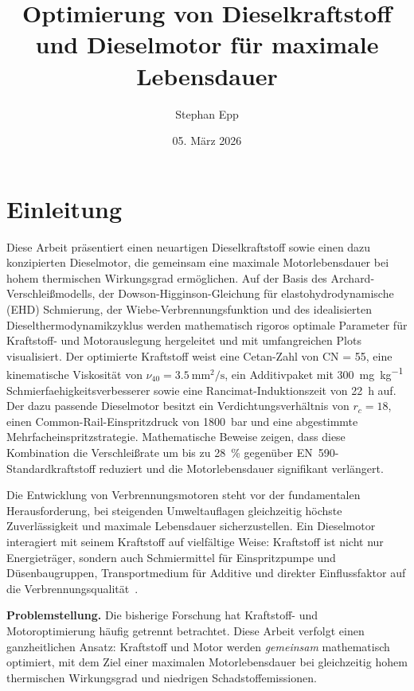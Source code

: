 ﻿\documentclass[12pt,a4paper]{article}
\title{\textbf{Optimierung von Dieselkraftstoff und Dieselmotor für maximale Lebensdauer}}
\author{Stephan Epp}
\date{05. März 2026}
\newcommand{\CN}{\ensuremath{\mathrm{CN}}}
\newcommand{\rc}{\ensuremath{r_c}}
\begin{document}
\maketitle

\tableofcontents
\newpage


\section{Einleitung}
\label{sec:einleitung}
Diese Arbeit präsentiert einen neuartigen Dieselkraftstoff sowie einen
dazu konzipierten Dieselmotor, die gemeinsam eine maximale Motorlebensdauer
bei hohem thermischen Wirkungsgrad ermöglichen. Auf der Basis des
Archard-Verschlei\ss{}modells, der Dowson-Higginson-Gleichung für
elastohydrodynamische (EHD) Schmierung, der Wiebe-Verbrennungsfunktion
und des idealisierten Dieselthermodynamikzyklus werden mathematisch
rigoros optimale Parameter für Kraftstoff- und Motorauslegung hergeleitet
und mit umfangreichen Plots visualisiert. Der optimierte Kraftstoff weist
eine Cetan-Zahl von \CN{} = 55, eine kinematische Viskosität von
$\nu_{40} = \SI{3.5}{\mm\squared\per\s}$, ein Additivpaket mit
\SI{300}{\mg\per\kg} Schmierfaehigkeitsverbesserer sowie eine
Rancimat-Induktionszeit von \SI{22}{\hour} auf. Der dazu passende
Dieselmotor besitzt ein Verdichtungsverhältnis von $\rc = 18$, einen
Common-Rail-Einspritzdruck von \SI{1800}{\bar} und eine abgestimmte
Mehrfacheinspritzstrategie. Mathematische Beweise zeigen, dass diese
Kombination die Verschlei\ss{}rate um bis zu \SI{28}{\percent} gegenüber
EN~590-Standardkraftstoff reduziert und die Motorlebensdauer signifikant
verlängert.

Die Entwicklung von Verbrennungsmotoren steht vor der fundamentalen
Herausforderung, bei steigenden Umweltauflagen gleichzeitig höchste
Zuverlässigkeit und maximale Lebens\-dauer sicherzustellen. Ein Dieselmotor
interagiert mit seinem Kraftstoff auf vielfältige Weise: Kraftstoff ist
nicht nur Energieträger, sondern auch Schmiermittel für Einspritzpumpe
und Düsenbaugruppen, Transportmedium für Additive und direkter Einflussfaktor
auf die Verbrennungsqualität~\cite{heywood1988}.

\textbf{Problemstellung.} Die bisherige Forschung hat Kraftstoff- und
Motoroptimierung häufig getrennt betrachtet. Diese Arbeit verfolgt einen
ganzheitlichen Ansatz: Kraftstoff und Motor werden \emph{gemeinsam}
mathematisch optimiert, mit dem Ziel einer maximalen Motorlebensdauer bei
gleichzeitig hohem thermischen Wirkungsgrad und niedrigen Schadstoffemissionen.
\end{document}
